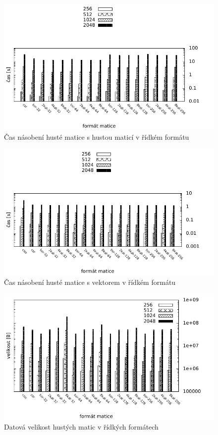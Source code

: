 \begin{figure}[htb]
	\includegraphics[width=1.0\textwidth]{./images/dense/mmm-speedtime}
	\caption{Čas násobení husté matice s hustou maticí v řídkém formátu}
	\label{fig:denmmm}
\end{figure}

\begin{figure}[htb]
	\includegraphics[width=1.0\textwidth]{./images/dense/mvm-speedtime}
	\caption{Čas násobení husté matice s vektorem v řídkém formátu}
	\label{fig:denmvm}
\end{figure}

\begin{figure}[htb]
	\includegraphics[width=1.0\textwidth]{./images/dense/ram-size}
	\caption{Datová velikost hustých matic v řídkých formátech}
	\label{fig:denram}
\end{figure}

